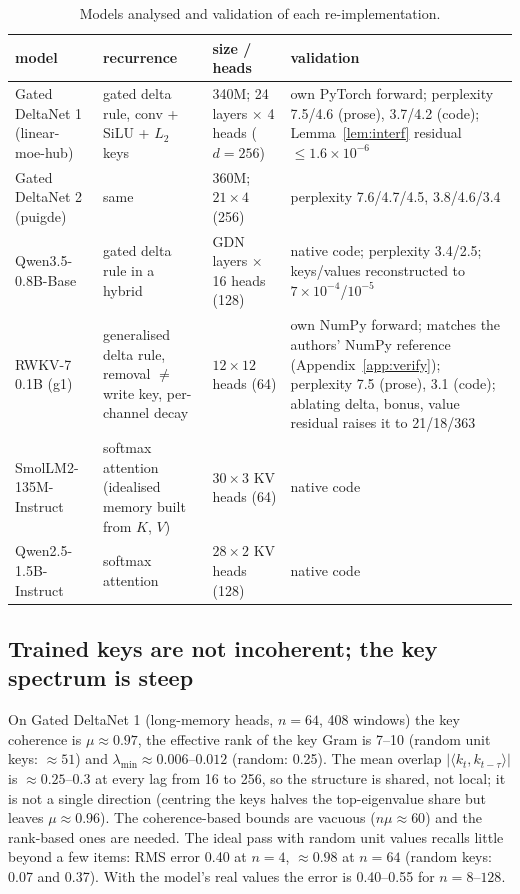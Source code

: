 \begin{table}[!htbp]
  \caption{Models analysed and validation of each re-implementation.}
  \centering\scriptsize\setlength{\tabcolsep}{3.5pt}
  \begin{tabular}{>{\raggedright\arraybackslash}p{3.0cm}>{\raggedright\arraybackslash}p{3.3cm}>{\raggedright\arraybackslash}p{2.6cm}>{\raggedright\arraybackslash}p{5.0cm}}
    \toprule
    model & recurrence & size / heads & validation \\
    \midrule
    Gated DeltaNet 1 (linear-moe-hub) & gated delta rule, conv + SiLU + $L_2$ keys & 340M; 24 layers $\times$ 4 heads ($d{=}256$) & own PyTorch forward; perplexity 7.5/4.6 (prose), 3.7/4.2 (code); Lemma~\ref{lem:interf} residual $\le1.6\times10^{-6}$ \\
    Gated DeltaNet 2 (puigde) & same & 360M; $21\times4$ (256) & perplexity 7.6/4.7/4.5, 3.8/4.6/3.4 \\
    Qwen3.5-0.8B-Base & gated delta rule in a hybrid & 18 GDN layers $\times$ 16 heads (128) & native code; perplexity 3.4/2.5; keys/values reconstructed to $7\times10^{-4}$/$10^{-5}$ \\
    RWKV-7 0.1B (g1) & generalised delta rule, removal $\neq$ write key, per-channel decay & $12\times12$ heads (64) & own NumPy forward; matches the authors' NumPy reference (Appendix~\ref{app:verify}); perplexity 7.5 (prose), 3.1 (code); ablating delta, bonus, value residual raises it to 21/18/363 \\
    SmolLM2-135M-Instruct & softmax attention (idealised memory built from $K$, $V$) & $30\times3$ KV heads (64) & native code \\
    Qwen2.5-1.5B-Instruct & softmax attention & $28\times2$ KV heads (128) & native code \\
    \bottomrule
  \end{tabular}
\end{table}

\subsection{Trained keys are not incoherent; the key spectrum is steep}
On Gated DeltaNet 1 (long-memory heads, $n=64$, 408 windows) the key coherence is $\mu\approx0.97$, the effective rank of the key Gram is 7--10 (random unit keys: $\approx51$) and $\lambda_{\min}\approx0.006$--$0.012$ (random: 0.25). The mean overlap $|\langle k_t,k_{t-\tau}\rangle|$ is $\approx0.25$--$0.3$ at every lag from 16 to 256, so the structure is shared, not local; it is not a single direction (centring the keys halves the top-eigenvalue share but leaves $\mu\approx0.96$). The coherence-based bounds are vacuous ($n\mu\approx60$) and the rank-based ones are needed. The ideal pass with random unit values recalls little beyond a few items: RMS error 0.40 at $n=4$, $\approx0.98$ at $n=64$ (random keys: 0.07 and 0.37). With the model's real values the error is 0.40--0.55 for $n=8$--$128$.

